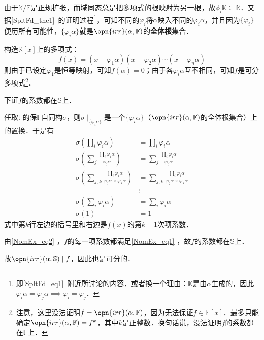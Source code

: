 由于$\mathbb{K}/\mathbb{F}$是正规扩张，而域同态总是把多项式的根映射为另一根，故$\phi_i\mathbb{K}\subseteq\mathbb{K}$．又据\autoref{SpltFd_the1}~的证明过程\footnote{即\autoref{SpltFd_eq1}~附近所讨论的内容．或者换一个理由：$\mathbb{K}$是由$\alpha$生成的，因此$\varphi_i\alpha=\varphi_j\alpha\implies \varphi_i=\varphi_j$．}，可知不同的$\varphi_i$将$\alpha$映入不同的$\varphi_i\alpha$，并且因为$\{\varphi_i\}$便历所有可能性，$\{\varphi_i\alpha\}$就是$\opn{irr}(\alpha, \mathbb{F})$的\textbf{全体根}集合．

构造$\mathbb{K}[x]$上的多项式：
\begin{equation}
f(x) = (x-\varphi_1\alpha)(x-\varphi_2\alpha)\cdots(x-\varphi_n\alpha)
\end{equation}
则由于已设定$\varphi_1$是恒等映射，可知$f(\alpha)=0$；由于各$\varphi_i\alpha$互不相同，可知$f$是可分多项式\footnote{注意，这里没法证明$f=\opn{irr}(\alpha, \mathbb{F})$，因为无法保证$f\in\mathbb{F}[x]$．最多只能确定$\opn{irr}(\alpha, \mathbb{F})=f^k$，其中$k$是正整数．换句话说，没法证明$f$的系数都在$\mathbb{F}$上．}．

下证$f$的系数都在$\mathbb{S}$上．

任取$\overline{\mathbb{F}}$的保$\mathbb{F}$自同构$\sigma$，则$\sigma\mid_{\{\varphi_i\alpha\}}$是一个$\{\varphi_i\alpha\}$（$\opn{irr}(\alpha, \mathbb{F})$的全体根集合）上的置换．于是有
\begin{equation}\label{NomEx_eq2}
\begin{aligned}
\sigma(\prod_i \varphi_i\alpha) &= \prod_i \varphi_i\alpha\\
\sigma(\sum_{j}\frac{\prod_i \varphi_i\alpha}{\varphi_j\alpha}) &= \sum_{j}\frac{\prod_i \varphi_i\alpha}{\varphi_j\alpha}\\
\sigma(\sum_{j, k}\frac{\prod_i \varphi_i\alpha}{\varphi_j\alpha\times\varphi_k\alpha}) &= \sum_{j, k}\frac{\prod_i \varphi_i\alpha}{\varphi_j\alpha\times\varphi_k\alpha}\\
&\vdots\\
\sigma(\sum_i\varphi_i\alpha) &= \sum_i\varphi_i\alpha\\
\sigma(1) &= 1
\end{aligned}
\end{equation}
式中第$k$行左边的括号里和右边是$f(x)$的第$k-1$次项系数．

由\autoref{NomEx_eq2} ，$f$的每一项系数都满足\autoref{NomEx_eq1} ，故$f$的系数都在$\mathbb{S}$上．

故$\opn{irr}(\alpha, \mathbb{S})\mid f$，因此也是可分的．

